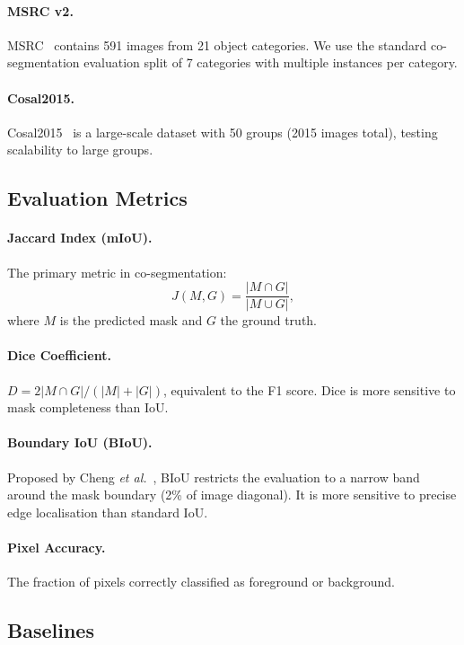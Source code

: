 \documentclass[10pt,twocolumn,letterpaper]{article}
\begin{document}
\paragraph{MSRC v2.}
MSRC~\cite{shotton2006textonboost} contains 591 images from 21 object categories.
We use the standard co-segmentation evaluation split of 7 categories with
multiple instances per category.

\paragraph{Cosal2015.}
Cosal2015~\cite{zhang2015cosaliency} is a large-scale dataset with 50 groups
(2015 images total), testing scalability to large groups.

\subsection{Evaluation Metrics}

\paragraph{Jaccard Index (mIoU).}
The primary metric in co-segmentation:
\begin{equation}
  J(M, G) = \frac{|M \cap G|}{|M \cup G|},
\end{equation}
where $M$ is the predicted mask and $G$ the ground truth.

\paragraph{Dice Coefficient.}
$D = 2|M \cap G| / (|M| + |G|)$, equivalent to the F1 score.
Dice is more sensitive to mask completeness than IoU.

\paragraph{Boundary IoU (BIoU).}
Proposed by Cheng \emph{et al.}~\cite{cheng2021boundary}, BIoU restricts
the evaluation to a narrow band around the mask boundary (2\% of image diagonal).
It is more sensitive to precise edge localisation than standard IoU.

\paragraph{Pixel Accuracy.}
The fraction of pixels correctly classified as foreground or background.

\subsection{Baselines}
\end{document}
